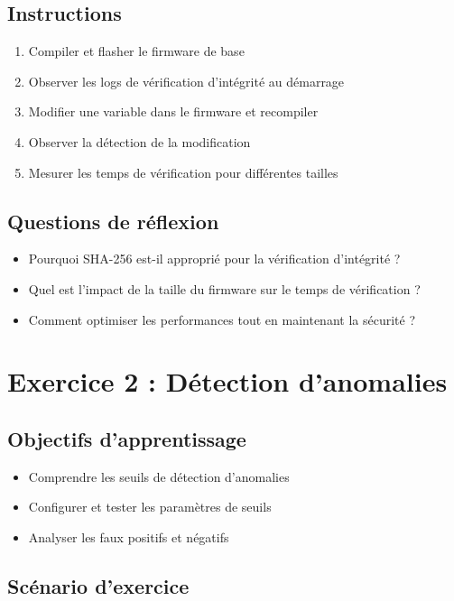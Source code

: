 \subsection{Instructions}

\begin{enumerate}
    \item Compiler et flasher le firmware de base
    \item Observer les logs de vérification d'intégrité au démarrage
    \item Modifier une variable dans le firmware et recompiler
    \item Observer la détection de la modification
    \item Mesurer les temps de vérification pour différentes tailles
\end{enumerate}

\subsection{Questions de réflexion}

\begin{itemize}
    \item Pourquoi SHA-256 est-il approprié pour la vérification d'intégrité ?
    \item Quel est l'impact de la taille du firmware sur le temps de vérification ?
    \item Comment optimiser les performances tout en maintenant la sécurité ?
\end{itemize}

\section{Exercice 2 : Détection d'anomalies}

\subsection{Objectifs d'apprentissage}

\begin{itemize}
    \item Comprendre les seuils de détection d'anomalies
    \item Configurer et tester les paramètres de seuils
    \item Analyser les faux positifs et négatifs
\end{itemize}

\subsection{Scénario d'exercice}

